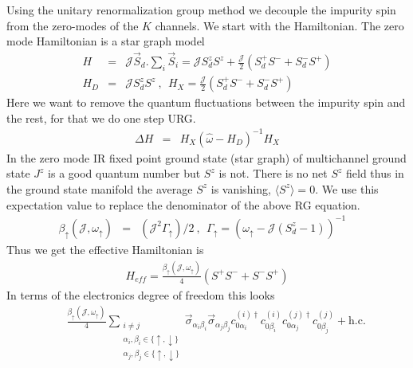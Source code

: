 \documentclass[reprint,prb,superscriptaddress]{revtex4-1}
\begin{document}
\noindent Using the unitary renormalization group method we decouple the impurity spin from the zero-modes of the $K$ channels. We start with the Hamiltonian. The zero mode Hamiltonian is a star graph model 
\begin{eqnarray}
H &=& {\mathcal{J}} \vec{S}_d.\displaystyle\sum_i \vec{S}_i ={\mathcal{J}} S_d^zS^z + \frac{{\mathcal{J}}}{2} (S_d^+S^-+ S_d^-S^+) \nonumber\\
H_D &=& {\mathcal{J}} S^z_d S^z~,~~ H_X = \frac{{\mathcal{J}}}{2} (S_d^+S^-+ S_d^-S^+)
\end{eqnarray}
Here we want to remove the quantum fluctuations between the impurity spin and the rest, for that we do one step URG.
\begin{eqnarray}
\Delta H &=& H_X ({\hat{\omega}-H_D})^{-1} H_X 
\end{eqnarray}
In the zero mode IR fixed point ground state (star graph) of multichannel ground state $J^z$ is a good quantum number but $S^z$ is not. There is no net $S^z$ field thus in the ground state manifold the average $S^z$ is vanishing, $\langle S^z \rangle=0$. We use this expectation value to replace the denominator of the above RG equation.
\begin{eqnarray}
\beta_{\uparrow} ({\mathcal{J}},\omega_{\uparrow})&=& ({\mathcal{J}}^2 \Gamma_{\uparrow})/2 ~,~~\Gamma_{\uparrow}=(\omega_{\uparrow}-{\mathcal{J}}(S_d^z-1))^{-1}~~~~
\end{eqnarray}
Thus we get the effective Hamiltonian is 
\begin{eqnarray}
H_{eff} 
 =\frac{\beta_{\uparrow}({\mathcal{J}},\omega_{\uparrow})}{4} (S^+S^-+S^-S^+)   
\end{eqnarray}
In terms of the electronics degree of freedom this looks 
\begin{eqnarray}
&& \frac{ \beta_{\uparrow}({\mathcal{J}},\omega_{\uparrow}) }{4}   \displaystyle\sum_{\substack{i\neq j \\ \alpha_i,\beta_i\in \{\uparrow,\downarrow\}\\ \alpha_j,\beta_j\in \{\uparrow,\downarrow\}}}\vec{\sigma}_{\alpha_i\beta_i}\vec{\sigma}_{\alpha_j\beta_j}  c_{0\alpha_i}^{(i)\dagger}  c_{0\beta_i}^{(i)}    c_{0\alpha_j}^{(j)\dagger}  c_{0\beta_j}^{(j)} +\textrm{h.c.}   \nonumber
\label{eq:all-to-all_1}
\end{eqnarray}
\end{document}
